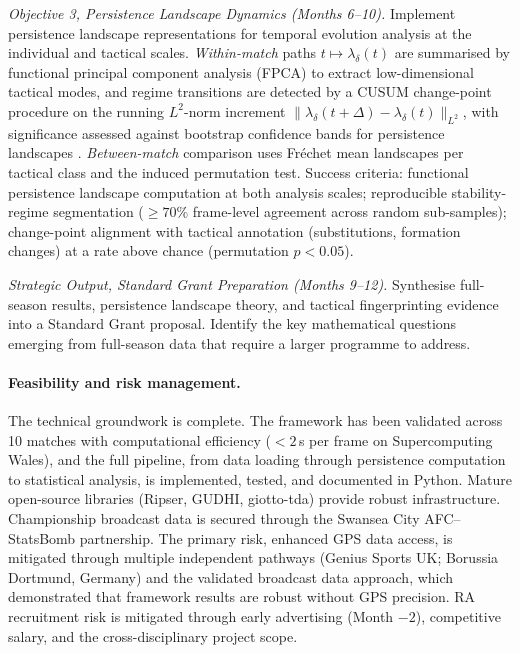 \textit{Objective 3, Persistence Landscape Dynamics (Months 6--10).} Implement persistence landscape representations \citep{Bubenik2015} for temporal evolution analysis at the individual and tactical scales. \emph{Within-match} paths $t \mapsto \lambda_\delta(t)$ are summarised by functional principal component analysis (FPCA) \citep{RamsaySilverman2005} to extract low-dimensional tactical modes, and regime transitions are detected by a CUSUM change-point procedure \citep{Page1954} on the running $L^2$-norm increment $\| \lambda_\delta(t+\Delta) - \lambda_\delta(t) \|_{L^2}$, with significance assessed against bootstrap confidence bands for persistence landscapes \citep{Chazal2014}. \emph{Between-match} comparison uses Fr\'echet mean landscapes per tactical class and the induced permutation test. Success criteria: functional persistence landscape computation at both analysis scales; reproducible stability-regime segmentation ($\geq 70\%$ frame-level agreement across random sub-samples); change-point alignment with tactical annotation (substitutions, formation changes) at a rate above chance (permutation $p < 0.05$).

\textit{Strategic Output, Standard Grant Preparation (Months 9--12).} Synthesise full-season results, persistence landscape theory, and tactical fingerprinting evidence into a Standard Grant proposal. Identify the key mathematical questions emerging from full-season data that require a larger programme to address.

\paragraph{Feasibility and risk management.}
The technical groundwork is complete. The framework has been validated across 10 matches with computational efficiency (${<}2$\,s per frame on Supercomputing Wales), and the full pipeline, from data loading through persistence computation to statistical analysis, is implemented, tested, and documented in Python. Mature open-source libraries (Ripser, GUDHI, giotto-tda) provide robust infrastructure. Championship broadcast data is secured through the Swansea City AFC--StatsBomb partnership. The primary risk, enhanced GPS data access, is mitigated through multiple independent pathways (Genius Sports UK; Borussia Dortmund, Germany) and the validated broadcast data approach, which demonstrated that framework results are robust without GPS precision. RA recruitment risk is mitigated through early advertising (Month $-2$), competitive salary, and the cross-disciplinary project scope.

